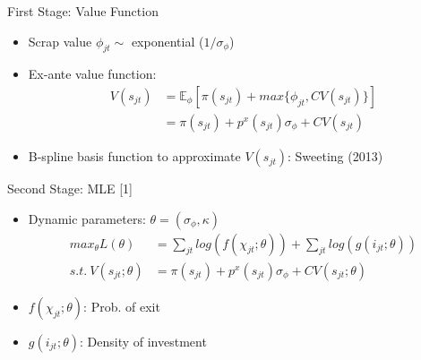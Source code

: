 \documentclass[xcolor=dvipsnames,envcountsect]{beamer}
\begin{document}
\begin{frame}{First Stage: Value Function}
\begin{itemize}
    \item Scrap value $\phi_{jt} \sim $ exponential ($1/\sigma_\phi$)
    \item Ex-ante value function:
    \begin{align}
        V(s_{jt}) & = \mathbb{E}_\phi[\pi(s_{jt}) + max\{\phi_{jt},CV(s_{jt})\}] \nonumber \\
        & = \pi(s_{jt}) + p^x(s_{jt}) \sigma_\phi + CV(s_{jt})
    \end{align}
    \item B-spline basis function to approximate $V(s_{jt})$: Sweeting (2013)
\end{itemize}
\end{frame}

\begin{frame}{Second Stage: MLE [1]}
\begin{itemize}
    \item Dynamic parameters: $\theta = (\sigma_\phi, \kappa)$
       \begin{align}
        max_\theta L(\theta) & = \sum_{jt} log(f(\chi_{jt};\theta)) + \sum_{jt} log(g(i_{jt};\theta)) \nonumber \\
        s.t. \ V(s_{jt};\theta) & = \pi(s_{jt}) + p^x(s_{jt}) \sigma_\phi + CV(s_{jt};\theta)  \nonumber
        \end{align}
     \item $f(\chi_{jt};\theta)$: Prob. of exit
     \item $g(i_{jt};\theta)$: Density of investment
\end{itemize}
\end{frame}
\end{document}
